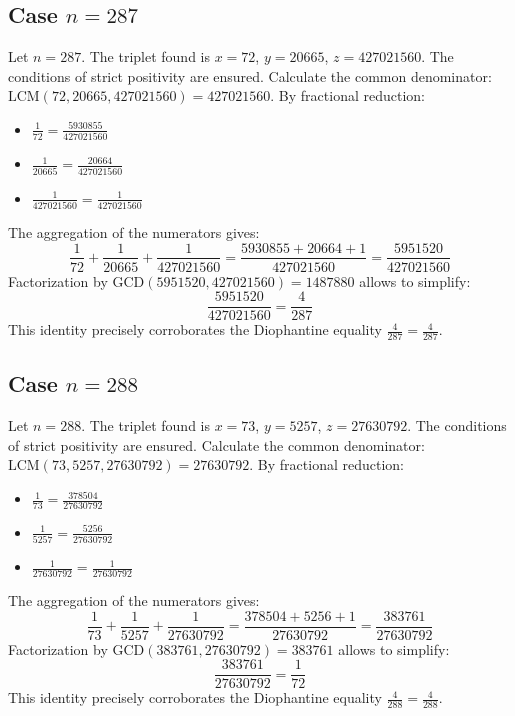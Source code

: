 \documentclass[11pt,a4paper]{article}
\begin{document}
\subsection{Case $n = 287$}
Let $n = 287$. The triplet found is $x = 72$, $y = 20665$, $z = 427021560$.
The conditions of strict positivity are ensured.
Calculate the common denominator: $\text{LCM}(72, 20665, 427021560) = 427021560$.
By fractional reduction:
\begin{itemize}
    \item $\frac{1}{72} = \frac{5930855}{427021560}$
    \item $\frac{1}{20665} = \frac{20664}{427021560}$
    \item $\frac{1}{427021560} = \frac{1}{427021560}$
\end{itemize}
The aggregation of the numerators gives:
$$ \frac{1}{72} + \frac{1}{20665} + \frac{1}{427021560} = \frac{5930855 + 20664 + 1}{427021560} = \frac{5951520}{427021560} $$
Factorization by $\text{GCD}(5951520, 427021560) = 1487880$ allows to simplify:
$$ \frac{5951520}{427021560} = \frac{4}{287} $$
This identity precisely corroborates the Diophantine equality $\frac{4}{287} = \frac{4}{287}$.

\subsection{Case $n = 288$}
Let $n = 288$. The triplet found is $x = 73$, $y = 5257$, $z = 27630792$.
The conditions of strict positivity are ensured.
Calculate the common denominator: $\text{LCM}(73, 5257, 27630792) = 27630792$.
By fractional reduction:
\begin{itemize}
    \item $\frac{1}{73} = \frac{378504}{27630792}$
    \item $\frac{1}{5257} = \frac{5256}{27630792}$
    \item $\frac{1}{27630792} = \frac{1}{27630792}$
\end{itemize}
The aggregation of the numerators gives:
$$ \frac{1}{73} + \frac{1}{5257} + \frac{1}{27630792} = \frac{378504 + 5256 + 1}{27630792} = \frac{383761}{27630792} $$
Factorization by $\text{GCD}(383761, 27630792) = 383761$ allows to simplify:
$$ \frac{383761}{27630792} = \frac{1}{72} $$
This identity precisely corroborates the Diophantine equality $\frac{4}{288} = \frac{4}{288}$.
\end{document}
